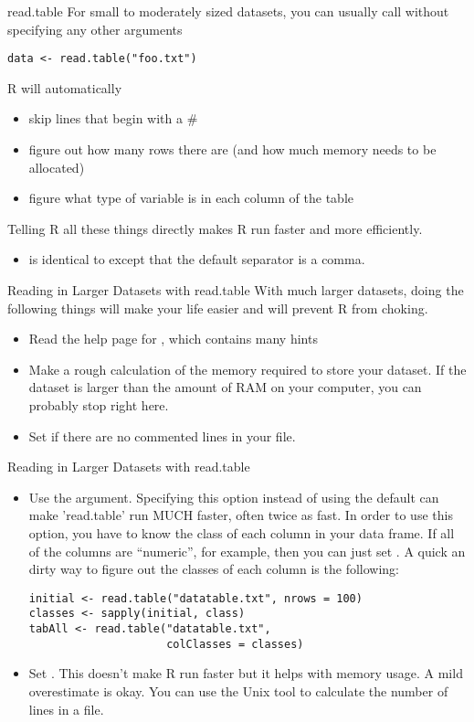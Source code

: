 \documentclass[aspectratio=169]{beamer}
\begin{document}
\begin{frame}[fragile]{read.table}
For small to moderately sized datasets, you can usually call
 without specifying any other arguments
\begin{verbatim}
data <- read.table("foo.txt")
\end{verbatim}
R will automatically
\begin{itemize}
\item
skip lines that begin with a \#
\item
figure out how many rows there are (and how much memory needs to be
allocated)
\item
figure what type of variable is in each column of the table
\end{itemize}
Telling R all these things directly makes R run faster and more
efficiently.
\begin{itemize}
\item
{} is identical to  except that the
default separator is a comma.
\end{itemize}
\end{frame}


\begin{frame}{Reading in Larger Datasets with read.table}
With much larger datasets, doing the following things will make your
life easier and will prevent R from choking.
\begin{itemize}
\item
Read the help page for , which contains many hints
\item
Make a rough calculation of the memory required to store your dataset.
If the dataset is larger than the amount of RAM on your computer, you
can probably stop right here.
\item
Set  if there are no commented lines in your
file.
\end{itemize}
\end{frame}


\begin{frame}[fragile]{Reading in Larger Datasets with read.table}
\begin{itemize}
\item
Use the  argument.  Specifying this option instead of
using the default can make 'read.table' run MUCH faster, often twice
as fast. In order to use this option, you have to know the class of
each column in your data frame. If all of the columns are ``numeric'',
for example, then you can just set .  A
quick an dirty way to figure out the classes of each column is the
following:
\begin{verbatim}
initial <- read.table("datatable.txt", nrows = 100)
classes <- sapply(initial, class)
tabAll <- read.table("datatable.txt", 
                     colClasses = classes)
\end{verbatim}
\item
Set .  This doesn't make R run faster but it helps with
memory usage.  A mild overestimate is okay.  You can use the Unix tool
 to calculate the number of lines in a file.
\end{itemize}
\end{frame}
\end{document}
